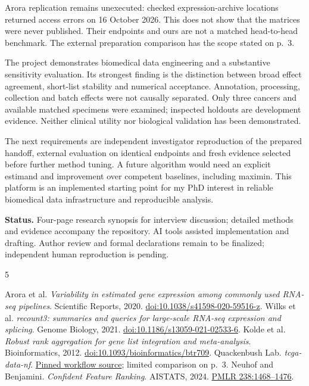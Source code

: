 \documentclass[10pt,letterpaper]{article}
\newcommand{\subtopic}[1]{\par\vspace{2pt}{\bfseries\color{ink}#1}\par}
\begin{document}
Arora replication remains unexecuted: checked expression-archive locations
returned access errors on 16 October 2026. This does not show that the matrices
were never published. Their endpoints and ours are not a matched head-to-head
benchmark. The external preparation comparison has the scope stated on p.~3.

\subtopic{Scope of inference and remaining work}
The project demonstrates biomedical data engineering and a substantive
sensitivity evaluation. Its strongest finding is the distinction between broad
effect agreement, short-list stability and numerical acceptance. Annotation,
processing, collection and batch effects were not causally separated. Only
three cancers and available matched specimens were examined; inspected holdouts
are development evidence. Neither clinical utility nor biological validation
has been demonstrated.

The next requirements are independent investigator reproduction of the prepared
handoff, external evaluation on identical endpoints and fresh evidence selected
before further method tuning. A future algorithm would need an explicit
estimand and improvement over competent baselines, including maximin. This
platform is an implemented starting point for my PhD interest in reliable
biomedical data infrastructure and reproducible analysis.

{\footnotesize\textbf{Status.} Four-page research synopsis for interview
 discussion; detailed methods and evidence accompany the repository. AI tools
 assisted implementation and drafting. Author review and formal declarations
 remain to be finalized; independent human reproduction is pending.}\par

\vspace{-3pt}
\begin{thebibliography}{5}\footnotesize\raggedright\setlength{\itemsep}{0pt}\setlength{\parskip}{0pt}
 Arora et al. \emph{Variability in estimated gene expression among commonly used RNA-seq pipelines}. Scientific Reports, 2020. \href{https://doi.org/10.1038/s41598-020-59516-z}{doi:10.1038/s41598-020-59516-z}.
 Wilks et al. \emph{recount3: summaries and queries for large-scale RNA-seq expression and splicing}. Genome Biology, 2021. \href{https://doi.org/10.1186/s13059-021-02533-6}{doi:10.1186/s13059-021-02533-6}.
 Kolde et al. \emph{Robust rank aggregation for gene list integration and meta-analysis}. Bioinformatics, 2012. \href{https://doi.org/10.1093/bioinformatics/btr709}{doi:10.1093/bioinformatics/btr709}.
 Quackenbush Lab. \emph{tcga-data-nf}. \href{https://github.com/QuackenbushLab/tcga-data-nf/tree/1069eb9c01b97640fd532ffac8551096d2a2790a}{Pinned workflow source}; limited comparison on p.~3.
 Neuhof and Benjamini. \emph{Confident Feature Ranking}. AISTATS, 2024. \href{https://proceedings.mlr.press/v238/neuhof24a.html}{PMLR 238:1468--1476}.
\end{thebibliography}
\end{document}
